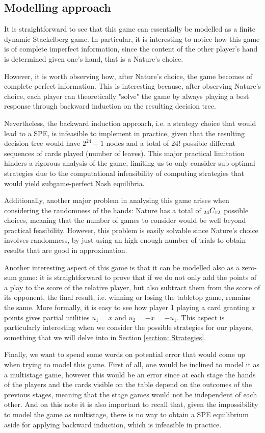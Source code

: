 \subsection{Modelling approach}

It is straightforward to see that this game can essentially be modelled as a finite dynamic Stackelberg game.
In particular, it is interesting to notice how this game is of complete imperfect information, since the content of the other player's hand is determined given one's hand, that is a Nature's choice.

However, it is worth observing how, after Nature's choice, the game becomes of complete perfect information.
This is interesting because, after observing Nature's choice, each player can theoretically "solve" the game by always playing a best response through backward induction on the resulting decision tree.

Nevertheless, the backward induction approach, i.e. a strategy choice that would lead to a SPE, is infeasible to implement in practice, given that the resulting decision tree would have $2^24 - 1$ nodes and a total of $24!$ possible different sequences of cards played (number of leaves).
This major practical limitation hinders a rigorous analysis of the game, limiting us to only consider sub-optimal strategies due to the computational infeasibility of computing strategies that would yield subgame-perfect Nash equilibria.

Additionally, another major problem in analysing this game arises when considering the randomness of the hands: Nature has a total of ${}_{24}C_{12}$ possible choices, meaning that the number of games to consider would be well beyond practical feasibility.
However, this problem is easily solvable since Nature's choice involves randomness, by just using an high enough number of trials to obtain results that are good in approximation.

Another interesting aspect of this game is that it can be modelled also as a zero-sum game: it is straightforward to prove that if we do not only add the points of a play to the score of the relative player, but also subtract them from the score of its opponent, the final result, i.e. winning or losing the tabletop game, remains the same. More formally, it is easy to see how player 1 playing a card granting $x$ points gives partial utilities $u_1 = x$ and $u_2 = -x = -u_1$.
This aspect is particularly interesting when we consider the possible strategies for our players, something that we will delve into in Section \ref{section: Strategies}.

Finally, we want to spend some words on potential error that would come up when trying to model this game.
First of all, one would be inclined to model it as a multistage game, however this would be an error since at each stage the hands of the players and the cards visible on the table depend on the outcomes of the previous stages, meaning that the stage games would not be independent of each other.
And on this note it is also important to recall that, given the impossibility to model the game as multistage, there is no way to obtain a SPE equilibrium aside for applying backward induction, which is infeasible in practice.
